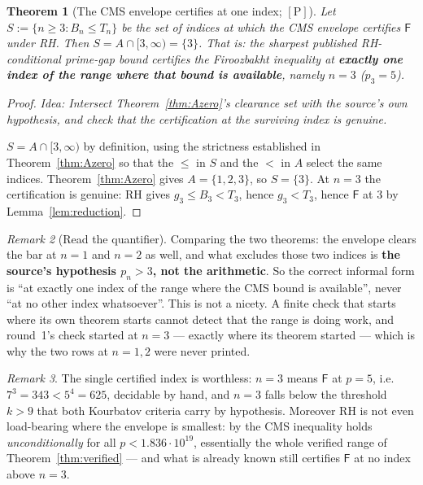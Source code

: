 \documentclass[11pt,a4paper]{article}
\theoremstyle{plain}
\newtheorem{theorem}{Theorem}[section]
\theoremstyle{definition}
\theoremstyle{remark}
\newtheorem{remark}[theorem]{Remark}
\newcommand{\idea}[1]{\emph{Idea: #1}\par\smallskip}
\newcommand{\cP}{{[\mathrm{P}]}}
\newcommand{\Fb}{\mathsf{F}}
\begin{document}
\begin{theorem}[The CMS envelope certifies at one index; $\cP$]
\label{thm:A}
Let $S := \{n \ge 3 : B_n \le T_n\}$ be the set of indices at which the CMS envelope certifies
$\Fb$ under RH. Then $S = A \cap [3,\infty) = \{3\}$. That is: the sharpest published
RH-conditional prime-gap bound certifies the Firoozbakht inequality at \textbf{exactly one index
of the range where that bound is available}, namely $n = 3$ ($p_3 = 5$).
\end{theorem}

\begin{proof}
\idea{Intersect Theorem~\ref{thm:Azero}'s clearance set with the source's own hypothesis, and
check that the certification at the surviving index is genuine.}
$S = A \cap [3,\infty)$ by definition, using the strictness established in
Theorem~\ref{thm:Azero} so that the $\le$ in $S$ and the $<$ in $A$ select the same indices.
Theorem~\ref{thm:Azero} gives $A = \{1,2,3\}$, so $S = \{3\}$. At $n = 3$ the certification is
genuine: RH gives $g_3 \le B_3 < T_3$, hence $g_3 < T_3$, hence $\Fb$ at $3$ by
Lemma~\ref{lem:reduction}.
\end{proof}

\begin{remark}[Read the quantifier]
\label{rem:quantifier}
Comparing the two theorems: the envelope clears the bar at $n = 1$ and $n = 2$ as well, and
what excludes those two indices is \textbf{the source's hypothesis $p_n > 3$, not the
arithmetic}. So the correct informal form is ``at exactly one index of the range where the CMS
bound is available'', never ``at no other index whatsoever''. This is not a nicety. A finite
check that starts where its own theorem starts cannot detect that the range is doing work, and
round~1's check started at $n = 3$ --- exactly where its theorem started --- which is why the
two rows at $n = 1, 2$ were never printed.
\end{remark}

\begin{remark}
The single certified index is worthless: $n = 3$ means $\Fb$ at $p = 5$, i.e.\
$7^3 = 343 < 5^4 = 625$, decidable by hand, and $n = 3$ falls below the threshold $k > 9$
that both Kourbatov criteria carry by hypothesis. Moreover RH is not even load-bearing where
the envelope is smallest: by \cite[\S7]{visser2018andrica} the CMS inequality holds
\emph{unconditionally} for all $p < 1.836\cdot10^{19}$, essentially the whole verified range
of Theorem~\ref{thm:verified} --- and what is already known still certifies $\Fb$ at no index
above $n = 3$.
\end{remark}
\end{document}
